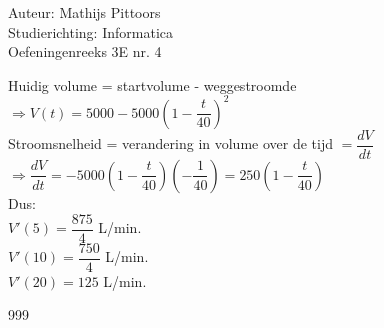 \documentclass[a4paper]{article}
\begin{document}
  
\noindent \large Auteur: Mathijs Pittoors \\
\noindent \large Studierichting: Informatica\\
\noindent \large Oefeningenreeks 3E nr. 4\\

\medskip

\normalsize

Huidig volume = startvolume - weggestroomde\\

$\Rightarrow V(t) = 5000 - 5000\left(1 - \dfrac{t}{40}\right)^2$\\

Stroomsnelheid = verandering in volume over de tijd $= \dfrac{dV}{dt}$\\

$\Rightarrow \dfrac{dV}{dt} = -5000\left(1 - \dfrac{t}{40}\right)\left(- \dfrac{1}{40}\right) =  250\left(1- \dfrac{t}{40}\right)$\\

Dus:\\

$V'(5) = \dfrac{875}{4}$ L/min.\\

$V'(10) = \dfrac{750}{4}$ L/min.\\

$V'(20) = 125$ L/min.\\



\begin{thebibliography}{999}
\end{thebibliography}
\end{document}
